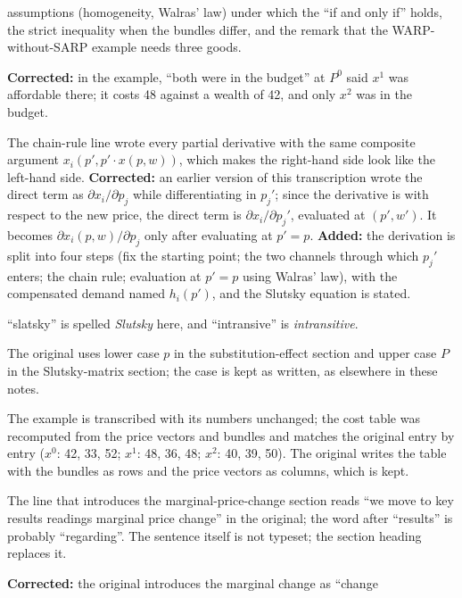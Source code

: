 \documentclass[11pt]{article}
\begin{document}
\begin{transcriptnotes}
        assumptions (homogeneity, Walras' law) under which the ``if and only if''
        holds, the strict inequality when the bundles differ, and the remark that
        the WARP-without-SARP example needs three goods.
  \item \textbf{Corrected:} in the example, ``both were in the budget'' at $P^{0}$
        said $x^{1}$ was affordable there; it costs 48 against a wealth of 42, and
        only $x^{2}$ was in the budget.
  \item The chain-rule line wrote every partial derivative with the same composite
        argument $x_i(p',p'\cdot x(p,w))$, which makes the right-hand side look
        like the left-hand side. \textbf{Corrected:} an earlier version of this
        transcription wrote the direct term as $\partial x_i/\partial p_j$ while
        differentiating in $p_j'$; since the derivative is with respect to the
        new price, the direct term is $\partial x_i/\partial p_j'$, evaluated at
        $(p',w')$. It becomes $\partial x_i(p,w)/\partial p_j$ only after
        evaluating at $p'=p$. \textbf{Added:} the derivation is split into four
        steps (fix the starting point; the two channels through which $p_j'$
        enters; the chain rule; evaluation at $p'=p$ using Walras' law), with the
        compensated demand named $h_i(p')$, and the Slutsky equation is stated.
  \item ``slatsky'' is spelled \emph{Slutsky} here, and ``intransive'' is
        \emph{intransitive}.
  \item The original uses lower case $p$ in the substitution-effect section and upper
        case $P$ in the Slutsky-matrix section; the case is kept as written, as
        elsewhere in these notes.
  \item The example is transcribed with its numbers unchanged; the cost table was
        recomputed from the price vectors and bundles and matches the original entry
        by entry ($x^{0}$: 42, 33, 52; $x^{1}$: 48, 36, 48; $x^{2}$: 40, 39, 50).
        The original writes the table with the bundles as rows and the price vectors
        as columns, which is kept.
  \item The line that introduces the marginal-price-change section reads ``we move
        to key results readings marginal price change'' in the original; the word
        after ``results'' is probably ``regarding''. The sentence itself is not
        typeset; the section heading replaces it.
  \item \textbf{Corrected:} the original introduces the marginal change as ``change

\end{transcriptnotes}
\end{document}
